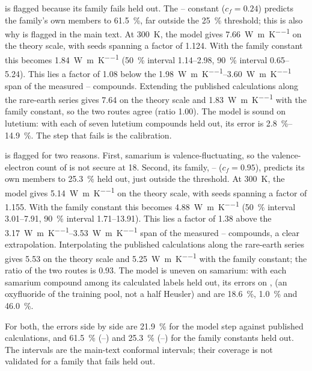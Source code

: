 \documentclass[preprint, 12pt]{elsarticle}
\begin{document}
 is flagged because its family fails held out. The -- constant
($c_f=\num{0.24}$) predicts the family's own members to \SI{61.5}{\percent}, far outside the
\SI{25}{\percent} threshold; this is also why  is flagged in the main text. At
\SI{300}{\kelvin}, the model gives \SI{7.66}{\watt\per\meter\per\kelvin} on the theory scale, with
seeds spanning a factor of \num{1.124}. With the family constant this becomes
\SI{1.84}{\watt\per\meter\per\kelvin} (\SI{50}{\percent} interval \numrange{1.14}{2.98},
\SI{90}{\percent} interval \numrange{0.65}{5.24}). This lies a factor of \num{1.08} below the
\SIrange{1.98}{3.60}{\watt\per\meter\per\kelvin} span of the measured -- compounds.
Extending the published calculations along the rare-earth series gives \num{7.64} on the theory
scale and \SI{1.83}{\watt\per\meter\per\kelvin} with the family constant, so the two routes agree
(ratio \num{1.00}). The model is sound on lutetium: with each of seven lutetium compounds held out,
its error is \SIrange{2.8}{14.9}{\percent}. The step that fails is the calibration.

 is flagged for two reasons. First, samarium is valence-fluctuating, so the
valence-electron count of  is not secure at 18. Second, its family, --
($c_f=\num{0.95}$), predicts its own members to \SI{25.3}{\percent} held out, just outside the
threshold. At \SI{300}{\kelvin}, the model gives \SI{5.14}{\watt\per\meter\per\kelvin} on the theory
scale, with seeds spanning a factor of \num{1.155}. With the family constant this becomes
\SI{4.88}{\watt\per\meter\per\kelvin} (\SI{50}{\percent} interval \numrange{3.01}{7.91},
\SI{90}{\percent} interval \numrange{1.71}{13.91}). This lies a factor of \num{1.38} above the
\SIrange{3.17}{3.53}{\watt\per\meter\per\kelvin} span of the measured -- compounds, a
clear extrapolation. Interpolating the published calculations along the rare-earth series gives
\num{5.53} on the theory scale and \SI{5.25}{\watt\per\meter\per\kelvin} with the family constant;
the ratio of the two routes is \num{0.93}. The model is uneven on samarium: with each samarium
compound among its calculated labels held out, its errors on ,  (an oxyfluoride
of the training pool, not a half Heusler) and  are \SI{18.6}{\percent},
\SI{1.0}{\percent} and \SI{46.0}{\percent}.

For both, the errors side by side are \SI{21.9}{\percent} for the model step against published
calculations, and \SI{61.5}{\percent} (--) and \SI{25.3}{\percent} (--)
for the family constants held out. The intervals are the main-text conformal intervals; their coverage is
not validated for a family that fails held out.
\end{document}
